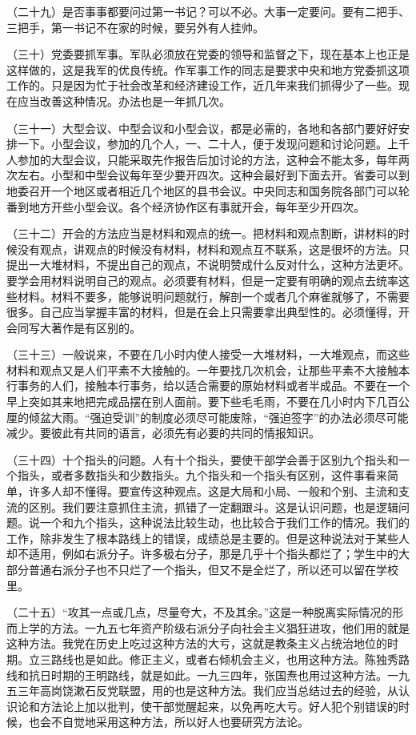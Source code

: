 （二十九）是否事事都要问过第一书记？可以不必。大事一定要问。要有二把手、三把手，第一书记不在家的时候，要另外有人挂帅。

（三十）党委要抓军事。军队必须放在党委的领导和监督之下，现在基本上也正是这样做的，这是我军的优良传统。作军事工作的同志是要求中央和地方党委抓这项工作的。只是因为忙于社会改革和经济建设工作，近几年来我们抓得少了一些。现在应当改善这种情况。办法也是一年抓几次。

（三十一）大型会议、中型会议和小型会议，都是必需的，各地和各部门要好好安排一下。小型会议，参加的几个人，一、二十人，便于发现问题和讨论问题。上千人参加的大型会议，只能采取先作报告后加讨论的方法，这种会不能太多，每年两次左右。小型和中型会议每年至少要开四次。这种会最好到下面去开。省委可以到地委召开一个地区或者相近几个地区的县书会议。中央同志和国务院各部门可以轮番到地方开些小型会议。各个经济协作区有事就开会，每年至少开四次。

（三十二）开会的方法应当是材料和观点的统一。把材料和观点割断，讲材料的时候没有观点，讲观点的时候没有材料，材料和观点互不联系，这是很坏的方法。只提出一大堆材料，不提出自己的观点，不说明赞成什么反对什么，这种方法更坏。要学会用材料说明自己的观点。必须要有材料，但是一定要有明确的观点去统率这些材料。材料不要多，能够说明问题就行，解剖一个或者几个麻雀就够了，不需要很多。自己应当掌握丰富的材料，但是在会上只需要拿出典型性的。必须懂得，开会同写大著作是有区别的。

（三十三）一般说来，不要在几小时内使人接受一大堆材料，一大堆观点，而这些材料和观点又是人们平素不大接触的。一年要找几次机会，让那些平素不大接触本行事务的人们，接触本行事务，给以适合需要的原始材料或者半成品。不要在一个早上突如其来地把完成品摆在别人面前。要下些毛毛雨，不要在几小时内下几百公厘的倾盆大雨。“强迫受训”的制度必须尽可能废除，“强迫签字”的办法必须尽可能减少。要彼此有共同的语言，必须先有必要的共同的情报知识。

（三十四）十个指头的问题。人有十个指头，要使干部学会善于区别九个指头和一个指头，或者多数指头和少数指头。九个指头和一个指头有区别，这件事看来简单，许多人却不懂得。要宣传这种观点。这是大局和小局、一般和个别、主流和支流的区别。我们要注意抓住主流，抓错了一定翻跟斗。这是认识问题，也是逻辑问题。说一个和九个指头，这种说法比较生动，也比较合于我们工作的情况。我们的工作，除非发生了根本路线上的错误，成绩总是主要的。但是这种说法对于某些人却不适用，例如右派分子。许多极右分子，那是几乎十个指头都烂了；学生中的大部分普通右派分子也不只烂了一个指头，但又不是全烂了，所以还可以留在学校里。

（二十五）“攻其一点或几点，尽量夸大，不及其余。”这是一种脱离实际情况的形而上学的方法。一九五七年资产阶级右派分子向社会主义猖狂进攻，他们用的就是这种方法。我党在历史上吃过这种方法的大亏，这就是教条主义占统治地位的时期。立三路线也是如此。修正主义，或者右倾机会主义，也用这种方法。陈独秀路线和抗日时期的王明路线，就是如此。一九三四年，张国焘也用过这种方法。一九五三年高岗饶漱石反党联盟，用的也是这种方法。我们应当总结过去的经验，从认识论和方法论上加以批判，使干部觉醒起来，以免再吃大亏。好人犯个别错误的时候，也会不自觉地采用这种方法，所以好人也要研究方法论。

